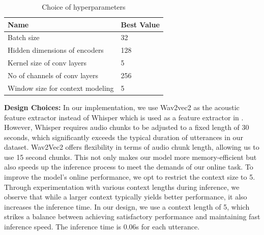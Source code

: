 \begin{table}
\small
\centering
\begin{tabular}{|l|l|}
\hline
\textbf{Name} & \textbf{Best Value} \\
\hline
Batch size & 32\\
Hidden dimensions of encoders & 128\\ 
Kernel size of conv layers & 5\\
No of channels of conv layers & 256\\
Window size for context modeling & 5\\
\hline
\end{tabular}
\caption{Choice of hyperparameters}
\label{tab:hyperparameters}
\end{table}

\textbf{Design Choices:} In our implementation, we use Wav2vec2 as the acoustic feature extractor instead of Whisper which is used as a feature extractor in \cite{miah-etal-2023-hierarchical}. However, Whisper \cite{radford2023robust} requires audio chunks to be adjusted to a fixed length of 30 seconds, which significantly exceeds the typical duration of utterances in our dataset. Wav2Vec2 offers flexibility in terms of audio chunk length, allowing us to use 15 second chunks. This not only makes our model more memory-efficient but also speeds up the inference process to meet the demands of our online task. To improve the model's online performance, we opt to restrict the context size to 5. Through experimentation with various context lengths during inference, we observe that while a larger context typically yields better performance, it also increases the inference time. In our design, we use a context length of 5, which strikes a balance between achieving satisfactory performance and maintaining fast inference speed. The inference time is 0.06s for each utterance.
